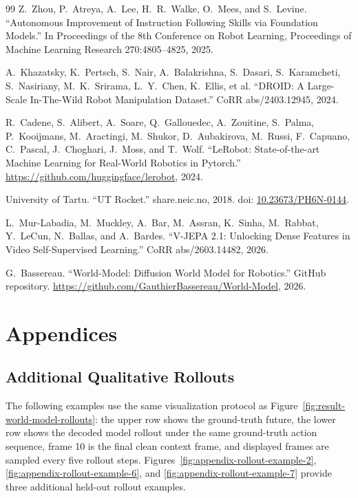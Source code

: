 \documentclass[12pt]{report}
\begin{document}
\begin{thebibliography}{99}
Z.~Zhou, P.~Atreya, A.~Lee, H.~R.~Walke, O.~Mees, and S.~Levine.
``Autonomous Improvement of Instruction Following Skills via Foundation Models.''
In Proceedings of the 8th Conference on Robot Learning, Proceedings of Machine Learning Research 270:4805--4825, 2025.

A.~Khazatsky, K.~Pertsch, S.~Nair, A.~Balakrishna, S.~Dasari, S.~Karamcheti, S.~Nasiriany, M.~K.~Srirama, L.~Y.~Chen, K.~Ellis, et al.
``DROID: A Large-Scale In-The-Wild Robot Manipulation Dataset.''
CoRR abs/2403.12945, 2024.

R.~Cadene, S.~Alibert, A.~Soare, Q.~Gallouedec, A.~Zouitine, S.~Palma, P.~Kooijmans, M.~Aractingi, M.~Shukor, D.~Aubakirova, M.~Russi, F.~Capuano, C.~Pascal, J.~Choghari, J.~Moss, and T.~Wolf.
``LeRobot: State-of-the-art Machine Learning for Real-World Robotics in Pytorch.''
\url{https://github.com/huggingface/lerobot}, 2024.

University of Tartu.
``UT Rocket.''
share.neic.no, 2018.
doi: \href{https://doi.org/10.23673/PH6N-0144}{10.23673/PH6N-0144}.

L.~Mur-Labadia, M.~Muckley, A.~Bar, M.~Assran, K.~Sinha, M.~Rabbat, Y.~LeCun, N.~Ballas, and A.~Bardes.
``V-JEPA 2.1: Unlocking Dense Features in Video Self-Supervised Learning.''
CoRR abs/2603.14482, 2026.

G.~Bassereau.
``World-Model: Diffusion World Model for Robotics.''
GitHub repository.
\url{https://github.com/GauthierBassereau/World-Model}, 2026.
\end{thebibliography}

\chapter*{Appendices}
\section*{Additional Qualitative Rollouts}
\label{app:additional-rollouts}

The following examples use the same visualization protocol as Figure~\ref{fig:result-world-model-rollouts}: the upper row shows the ground-truth future, the lower row shows the decoded model rollout under the same ground-truth action sequence, frame 10 is the final clean context frame, and displayed frames are sampled every five rollout steps. Figures~\ref{fig:appendix-rollout-example-2}, \ref{fig:appendix-rollout-example-6}, and \ref{fig:appendix-rollout-example-7} provide three additional held-out rollout examples.
\end{document}
